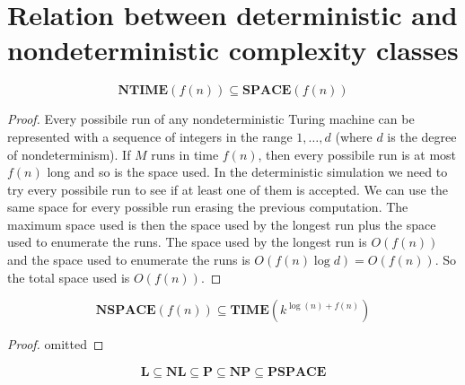 \documentclass[12pt]{article}
\begin{document}
\section{Relation between deterministic and nondeterministic complexity classes}
\begin{defbox}
  $$\textbf{NTIME}(f(n))\subseteq\textbf{SPACE}(f(n))$$
\end{defbox}
\begin{proof}
  Every possibile run of any nondeterministic Turing machine can be represented with a sequence of integers in the range $1,\ldots,d$ (where $d$ is the degree of nondeterminism). If $M$ runs in time $f(n)$, then every possibile run is at most $f(n)$ long and so is the space used. In the deterministic simulation we need to try every possibile run to see if at least one of them is accepted. We can use the same space for every possible run erasing the previous computation. The maximum space used is then the space used by the longest run plus the space used to enumerate the runs. The space used by the longest run is $O(f(n))$ and the space used to enumerate the runs is $O(f(n)\log d)=O(f(n))$.
  So the total space used is $O(f(n))$.
\end{proof}

\begin{defbox}
$$\textbf{NSPACE}(f(n))\subseteq\textbf{TIME}(k^{\log(n)+f(n)})$$  
\end{defbox}
\begin{proof}
  omitted
\end{proof}
\begin{defbox}[Corollary]
  $$\textbf{L}\subseteq\textbf{NL}\subseteq\textbf{P}\subseteq\textbf{NP}\subseteq\textbf{PSPACE}$$
  
\end{defbox}
\end{document}
